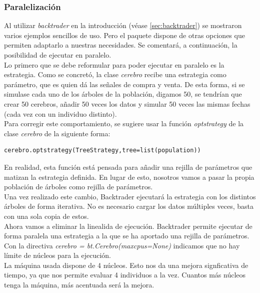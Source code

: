 \subsubsection{Paralelizaci\'on}
Al utilizar \textit{backtrader} en la introducci\'on (v\'ease \ref{sec:backtrader}) se mostraron varios ejemplos sencillos de uso. Pero el paquete dispone de otras opciones que permiten adaptarlo a nuestras necesidades. Se comentar\'a, a continuaci\'on, la posibilidad de ejecutar en paralelo.\\

Lo primero que se debe reformular para poder ejecutar en paralelo es la estrategia. Como se concret\'o, la clase \textit{cerebro} recibe una estrategia como par\'ametro, que es quien d\'a las se\~nales de compra y venta. De esta forma, si se simulase cada uno de los \'arboles de la poblaci\'on, digamos 50, se tendr\'ian que crear 50 cerebros, a\~nadir 50 veces los datos y simular 50 veces las mismas fechas (cada vez con un individuo distinto).\\

Para corregir este comportamiento, se sugiere usar la funci\'on \textit{optstrategy} de la clase \textit{cerebro} de la siguiente forma:\\

\begin{lstlisting}
cerebro.optstrategy(TreeStrategy,tree=list(population))
\end{lstlisting}

En realidad, esta funci\'on est\'a pensada para a\~nadir una rejilla de par\'ametros que matizan la estrategia definida. En lugar de esto, nosotros vamos a pasar la propia poblaci\'on de \'arboles como rejilla de par\'ametros.\\

Una vez realizado este cambio, Backtrader ejecutar\'a la estrategia con los distintos \'arboles de forma iterativa. No es necesario cargar los datos m\'ultiples veces, basta con una sola copia de estos.\\

Ahora vamos a eliminar la linealida de ejecuci\'on. Backtrader permite ejecutar de forma paralela una estrategia a la que se ha aportado una rejilla de par\'ametros. Con la directiva \textit{cerebro = bt.Cerebro(maxcpus=None)} indicamos que no hay l\'imite de n\'ucleos para la ejecuci\'on. \\

La m\'aquina usada dispone de 4 n\'ucleos. Esto nos da una mejora signficativa de tiempo, ya que nos permite evaluar 4 individuos a la vez. Cuantos m\'as n\'ucleos tenga la m\'aquina, m\'as acentuada ser\'a la mejora.\\


